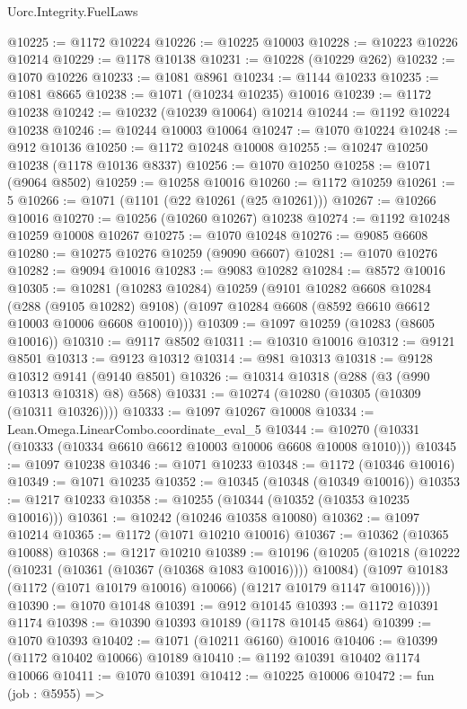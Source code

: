 \begin{lexlean}{Uorc.Integrity.FuelLaws}
\begin{coremodule}
@10225 := @1172 @10224
@10226 := @10225 @10003
@10228 := @10223 @10226 @10214
@10229 := @1178 @10138
@10231 := @10228 (@10229 @262)
@10232 := @1070 @10226
@10233 := @1081 @8961
@10234 := @1144 @10233
@10235 := @1081 @8665
@10238 := @1071 (@10234 @10235) @10016
@10239 := @1172 @10238
@10242 := @10232 (@10239 @10064) @10214
@10244 := @1192 @10224 @10238
@10246 := @10244 @10003 @10064
@10247 := @1070 @10224
@10248 := @912 @10136
@10250 := @1172 @10248 @10008
@10255 := @10247 @10250 @10238 (@1178 @10136 @8337)
@10256 := @1070 @10250
@10258 := @1071 (@9064 @8502)
@10259 := @10258 @10016
@10260 := @1172 @10259
@10261 := 5
@10266 := @1071 (@1101 (@22 @10261 (@25 @10261)))
@10267 := @10266 @10016
@10270 := @10256 (@10260 @10267) @10238
@10274 := @1192 @10248 @10259 @10008 @10267
@10275 := @1070 @10248
@10276 := @9085 @6608
@10280 := @10275 @10276 @10259 (@9090 @6607)
@10281 := @1070 @10276
@10282 := @9094 @10016
@10283 := @9083 @10282
@10284 := @8572 @10016
@10305 := @10281
    (@10283 @10284)
    @10259
    (@9101
      @10282
      @6608
      @10284
      (@288 (@9105 @10282) @9108)
      (@1097 @10284 @6608 (@8592 @6610 @6612 @10003 @10006 @6608 @10010)))
@10309 := @1097 @10259 (@10283 (@8605 @10016))
@10310 := @9117 @8502
@10311 := @10310 @10016
@10312 := @9121 @8501
@10313 := @9123 @10312
@10314 := @981 @10313
@10318 := @9128 @10312 @9141 (@9140 @8501)
@10326 := @10314 @10318 (@288 (@3 (@990 @10313 @10318) @8) @568)
@10331 := @10274 (@10280 (@10305 (@10309 (@10311 @10326))))
@10333 := @1097 @10267 @10008
@10334 := Lean.Omega.LinearCombo.coordinate_eval_5
@10344 := @10270 (@10331 (@10333 (@10334 @6610 @6612 @10003 @10006 @6608 @10008 @1010)))
@10345 := @1097 @10238
@10346 := @1071 @10233
@10348 := @1172 (@10346 @10016)
@10349 := @1071 @10235
@10352 := @10345 (@10348 (@10349 @10016))
@10353 := @1217 @10233
@10358 := @10255 (@10344 (@10352 (@10353 @10235 @10016)))
@10361 := @10242 (@10246 @10358 @10080)
@10362 := @1097 @10214
@10365 := @1172 (@1071 @10210 @10016)
@10367 := @10362 (@10365 @10088)
@10368 := @1217 @10210
@10389 := @10196
    (@10205
      (@10218
        (@10222 (@10231 (@10361 (@10367 (@10368 @1083 @10016)))) @10084)
        (@1097 @10183 (@1172 (@1071 @10179 @10016) @10066) (@1217 @10179 @1147 @10016))))
@10390 := @1070 @10148
@10391 := @912 @10145
@10393 := @1172 @10391 @1174
@10398 := @10390 @10393 @10189 (@1178 @10145 @864)
@10399 := @1070 @10393
@10402 := @1071 (@10211 @6160) @10016
@10406 := @10399 (@1172 @10402 @10066) @10189
@10410 := @1192 @10391 @10402 @1174 @10066
@10411 := @1070 @10391
@10412 := @10225 @10006
@10472 := fun (job : @5955) =>

\end{coremodule}
\end{lexlean}
